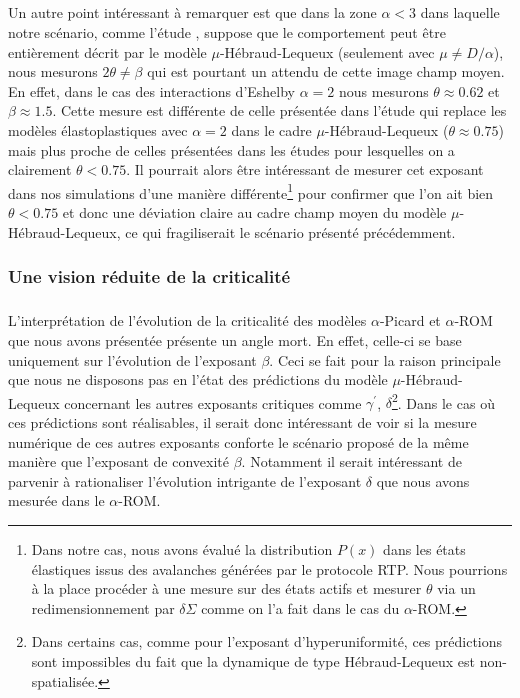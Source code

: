 \subparagraph{}Un autre point intéressant à remarquer est que dans la zone $\alpha < 3$ dans laquelle notre scénario, comme l'étude \cite{ferrero_criticality_2019}, suppose que le comportement peut être entièrement décrit par le modèle $\mu$-Hébraud-Lequeux (seulement avec $\mu \neq D/\alpha$), nous mesurons $2\theta \neq \beta$ qui est pourtant un attendu de cette image champ moyen. En effet, dans le cas des interactions d'Eshelby $\alpha = 2$ nous mesurons $\theta \approx 0.62$ et $\beta \approx 1.5$. Cette mesure est différente de celle présentée dans l'étude \cite{ferrero_criticality_2019} qui replace les modèles élastoplastiques avec $\alpha = 2$ dans le cadre $\mu$-Hébraud-Lequeux ($\theta \approx 0.75$) mais plus proche de celles présentées dans les études \cite{lin_scaling_2014, liu_driving_2016, lin_mean_field_2016} pour lesquelles on a clairement $\theta < 0.75$. Il pourrait alors être intéressant de mesurer cet exposant dans nos simulations d'une manière différente\footnote{Dans notre cas, nous avons évalué la distribution $P(x)$ dans les états élastiques issus des avalanches générées par le protocole RTP. Nous pourrions à la place procéder à une mesure sur des états actifs et mesurer $\theta$ via un redimensionnement par $\delta\Sigma$ comme on l'a fait dans le cas du $\alpha$-ROM.} pour confirmer que l'on ait bien $\theta < 0.75$ et donc une déviation claire au cadre champ moyen du modèle $\mu$-Hébraud-Lequeux, ce qui fragiliserait le scénario présenté précédemment.

\subsubsection{Une vision réduite de la criticalité}

\subparagraph{}L'interprétation de l'évolution de la criticalité des modèles $\alpha$-Picard et $\alpha$-ROM que nous avons présentée présente un angle mort. En effet, celle-ci se base uniquement sur l'évolution de l'exposant $\beta$. Ceci se fait pour la raison principale que nous ne disposons pas en l'état des prédictions du modèle $\mu$-Hébraud-Lequeux concernant les autres exposants critiques comme $\gamma^\prime$, $\delta$\footnote{Dans certains cas, comme pour l'exposant d'hyperuniformité, ces prédictions sont impossibles du fait que la dynamique de type Hébraud-Lequeux est non-spatialisée.}. Dans le cas où ces prédictions sont réalisables, il serait donc intéressant de voir si la mesure numérique de ces autres exposants conforte le scénario proposé de la même manière que l'exposant de convexité $\beta$. Notamment il serait intéressant de parvenir à rationaliser l'évolution intrigante de l'exposant $\delta$ que nous avons mesurée dans le $\alpha$-ROM.


